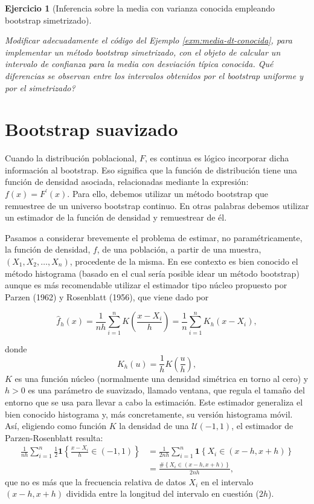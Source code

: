 \documentclass[
]{book}
\renewcommand{\mathbf}[1]{\symbf{#1}}
\theoremstyle{break}
\newtheorem{exercise}{Ejercicio}[chapter]
\theoremstyle{nonumberplain}
\begin{document}
\begin{exercise}[Inferencia sobre la media con varianza conocida empleando bootstrap simetrizado]
\protect\hypertarget{exr:media-dt-conocida-sim}{}\label{exr:media-dt-conocida-sim}

Modificar adecuadamente el código del Ejemplo \ref{exm:media-dt-conocida}, para
implementar un método bootstrap simetrizado, con el objeto de calcular
un intervalo de confianza para la media con desviación típica conocida.
Qué diferencias se observan entre los intervalos obtenidos por el
bootstrap uniforme y por el simetrizado?
\end{exercise}

\section{Bootstrap suavizado}\label{modunif-boot-suav}

Cuando la distribución poblacional, \(F\), es continua es lógico
incorporar dicha información al bootstrap. Eso significa que la función
de distribución tiene una función de densidad asociada, relacionadas
mediante la expresión: \(f\left( x \right) =F^{\prime}\left(
x \right)\). Para ello, debemos utilizar un método bootstrap que
remuestree de un universo bootstrap continuo. En otras palabras debemos
utilizar un estimador de la función de densidad y remuestrear de él.

Pasamos a considerar brevemente el problema de estimar, no
paramétricamente, la función de densidad, \(f\), de una población, a
partir de una muestra, \(\left( X_1,X_2,\ldots ,X_n \right)\),
procedente de la misma. En ese contexto es bien conocido el método
histograma (basado en el cual sería posible idear un método bootstrap)
aunque es más recomendable utilizar el estimador tipo núcleo propuesto
por Parzen (1962) y Rosenblatt (1956), que viene dado por

\[\hat{f}_{h}\left( x \right) =\frac{1}{nh}\sum_{i=1}^{n}K\left( \frac{x-X_i}{
h} \right) =\frac{1}{n}\sum_{i=1}^{n}K_{h}\left( x-X_i \right),\]

donde
\[K_{h}\left( u \right) =\frac{1}{h}K\left( \frac{u}{h} \right),\]
\(K\) es una función núcleo (normalmente una densidad simétrica en torno
al cero) y \(h>0\) es una parámetro de suavizado, llamado ventana, que
regula el tamaño del entorno que se usa para llevar a cabo la
estimación. Este estimador generaliza el bien conocido histograma y, más
concretamente, su versión histograma móvil. Así, eligiendo como función
\(K\) la densidad de una \(\mathcal{U}\left( -1,1 \right)\), el estimador de
Parzen-Rosenblatt resulta:
\[\begin{aligned}
\frac{1}{nh}\sum_{i=1}^{n}\frac{1}{2}\mathbf{1}\left\{ \frac{x-X_i}{h}\in
\left( -1,1 \right) \right\} &= \frac{1}{2nh}\sum_{i=1}^{n}\mathbf{1}\left\{
X_i\in \left( x-h,x+h \right) \right\} \\
&= \frac{\#\left\{ X_i\in \left( x-h,x+h \right) \right\} }{2nh},
\end{aligned}\]
que no es más que la frecuencia relativa de datos \(X_i\) en el
intervalo \(\left( x-h,x+h \right)\) dividida entre la longitud del
intervalo en cuestión (\(2h\)).
\end{document}
